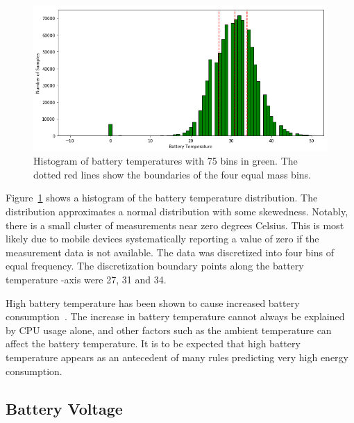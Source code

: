 \begin{figure} %
	\centering
	\includegraphics[width=\textwidth]{images/carat-data/battery_temperature_w_boundaries.png}
	\caption{Histogram of battery temperatures with 75 bins in green. The dotted red lines show the boundaries of the four equal mass bins.}
	\label{figure:carat-data-battery-temperature}
\end{figure}

Figure~\ref{figure:carat-data-battery-temperature} shows a histogram of the battery temperature distribution. The distribution approximates a normal distribution with some skewedness. Notably, there is a small cluster of measurements near zero degrees Celsius. This is most likely due to mobile devices systematically reporting a value of zero if the measurement data is not available. The data was discretized into four bins of equal frequency. The discretization boundary points along the battery temperature -axis were 27, 31 and 34. 

High battery temperature has been shown to cause increased battery consumption~\cite{7146507}. The increase in battery temperature cannot always be explained by CPU usage alone, and other factors such as the ambient temperature can affect the battery temperature. It is to be expected that high battery temperature appears as an antecedent of many rules predicting very high energy consumption.

\subsection{Battery Voltage}  

